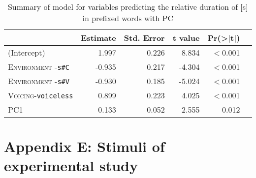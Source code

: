 \begin{table}
	
	\caption{ Summary of model for variables predicting the relative duration of [s] in prefixed words with PC}
	\label{model dis PC Corpus rel}

	\begin{tabular}{lrrrrr}
				\lsptoprule
		& Estimate                       & Std. Error            & t value & Pr(\textgreater|t|)  \\ \midrule
(Intercept) & 1.997 & 0.226 & 8.834 & $<$0.001  \\ 
\textsc{Environment} -\texttt{s\#C}  & -0.935 & 0.217 & -4.304 &$<$0.001  \\ 
\textsc{Environment} -\texttt{s\#V} & -0.930 & 0.185 & -5.024 & $<$0.001  \\ 
\textsc{Voicing}-\texttt{voiceless} & 0.899 & 0.223 & 4.025 & $<$0.001 \\ 
\textsc{PC1} & 0.133 & 0.052 & 2.555 & 0.012 \\ 
		\midrule	
	\end{tabular}
\end{table}


\clearpage

\section*{Appendix E: Stimuli of experimental study} \label{Appendix E: Stimuli of Experimental Study}




